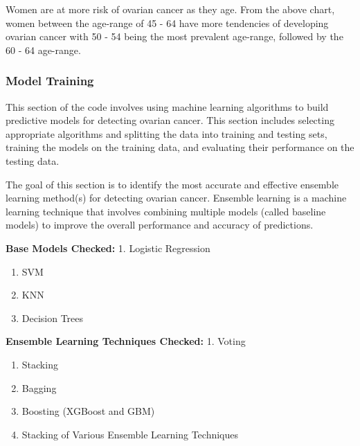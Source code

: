 \documentclass[11pt]{article}
\begin{document}
    
    
    Women are at more risk of ovarian cancer as they age. From the above
chart, women between the age-range of 45 - 64 have more tendencies of
developing ovarian cancer with 50 - 54 being the most prevalent
age-range, followed by the 60 - 64 age-range.

    \subsubsection{\texorpdfstring{Model Training
}{Model Training }}\label{model-training}

This section of the code involves using machine learning algorithms to
build predictive models for detecting ovarian cancer. This section
includes selecting appropriate algorithms and splitting the data into
training and testing sets, training the models on the training data, and
evaluating their performance on the testing data.

The goal of this section is to identify the most accurate and effective
ensemble learning method(s) for detecting ovarian cancer. Ensemble
learning is a machine learning technique that involves combining
multiple models (called baseline models) to improve the overall
performance and accuracy of predictions.

    \textbf{Base Models Checked:} 1. Logistic Regression

\begin{enumerate}
\def\labelenumi{\arabic{enumi}.}
\setcounter{enumi}{1}
\item
  SVM
\item
  KNN
\item
  Decision Trees
\end{enumerate}

\textbf{Ensemble Learning Techniques Checked:} 1. Voting

\begin{enumerate}
\def\labelenumi{\arabic{enumi}.}
\setcounter{enumi}{1}
\item
  Stacking
\item
  Bagging
\item
  Boosting (XGBoost and GBM)
\item
  Stacking of Various Ensemble Learning Techniques
\end{enumerate}
\end{document}
